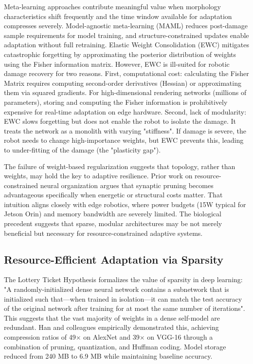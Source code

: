﻿\documentclass[12pt,a4paper,oneside]{report}
\begin{document}
Meta-learning approaches contribute meaningful value when morphology characteristics shift frequently and the time window available for adaptation compresses severely. Model-agnostic meta-learning (MAML) reduces post-damage sample requirements for model training, and structure-constrained updates enable adaptation without full retraining. Elastic Weight Consolidation (EWC) mitigates catastrophic forgetting by approximating the posterior distribution of weights using the Fisher information matrix. However, EWC is ill-suited for robotic damage recovery for two reasons. First, computational cost: calculating the Fisher Matrix requires computing second-order derivatives (Hessian) or approximating them via squared gradients. For high-dimensional rendering networks (millions of parameters), storing and computing the Fisher information is prohibitively expensive for real-time adaptation on edge hardware. Second, lack of modularity: EWC slows forgetting but does not enable the robot to isolate the damage. It treats the network as a monolith with varying "stiffness". If damage is severe, the robot needs to change high-importance weights, but EWC prevents this, leading to under-fitting of the damage (the "plasticity gap").

The failure of weight-based regularization suggests that topology, rather than weights, may hold the key to adaptive resilience. Prior work on resource-constrained neural organization argues that synaptic pruning becomes advantageous specifically when energetic or structural costs matter. That intuition aligns closely with edge robotics, where power budgets (15W typical for Jetson Orin) and memory bandwidth are severely limited. The biological precedent suggests that sparse, modular architectures may be not merely beneficial but necessary for resource-constrained adaptive systems.

\subsection{Resource-Efficient Adaptation via Sparsity}

The Lottery Ticket Hypothesis formalizes the value of sparsity in deep learning: "A randomly-initialized dense neural network contains a subnetwork that is initialized such that---when trained in isolation---it can match the test accuracy of the original network after training for at most the same number of iterations". This suggests that the vast majority of weights in a dense self-model are redundant. Han and colleagues empirically demonstrated this, achieving compression ratios of 49$\times$ on AlexNet and 39$\times$ on VGG-16 through a combination of pruning, quantization, and Huffman coding. Model storage reduced from 240 MB to 6.9 MB while maintaining baseline accuracy.
\end{document}
